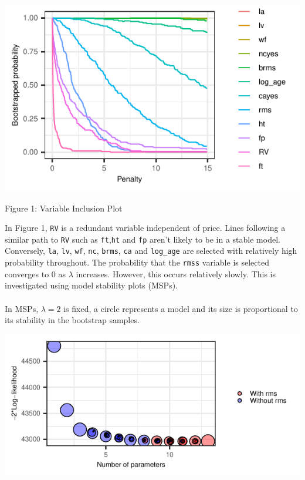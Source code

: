 \documentclass[letterpaper,9pt,twocolumn,twoside,]{pinp}
\begin{document}
\vspace{-10pt}

\begin{center}\includegraphics{Report_files/figure-latex/unnamed-chunk-8-1} \end{center}
\vspace{-10pt}

\centerline{\small Figure 1:  Variable Inclusion Plot}
\smallskip

\noindent In Figure 1, \texttt{RV} is a redundant variable independent
of price. Lines following a similar path to \texttt{RV} such as
\texttt{ft},\texttt{ht} and \texttt{fp} aren't likely to be in a stable
model. Conversely, \texttt{la}, \texttt{lv}, \texttt{wf}, \texttt{nc},
\texttt{brms}, \texttt{ca} and \texttt{log\_age} are selected with
relatively high probability throughout. The probability that the
\texttt{rms\textquotesingle{}s} variable is selected converges to 0 as
\(\lambda\) increases. However, this occurs relatively slowly. This is
investigated using model stability plots (MSPs).\\
~\\
\noindent In MSPs, \(\lambda = 2\) is fixed, a circle represents a model
and its size is proportional to its stability in the bootstrap samples.

\vspace{-15pt}

\begin{center}\includegraphics{Report_files/figure-latex/unnamed-chunk-10-1} \end{center}
\end{document}
